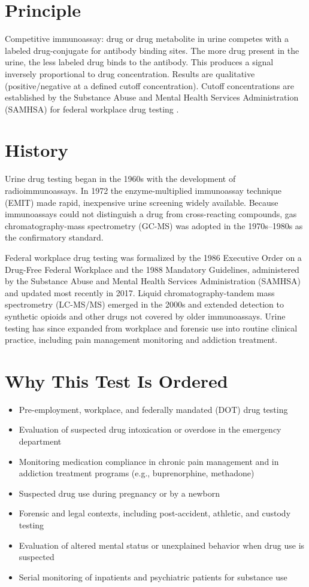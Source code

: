 \section*{Principle}
Competitive immunoassay: drug or drug metabolite in urine competes with a labeled drug-conjugate for antibody binding sites. The more drug present in the urine, the less labeled drug binds to the antibody. This produces a signal inversely proportional to drug concentration. Results are qualitative (positive/negative at a defined cutoff concentration). Cutoff concentrations are established by the Substance Abuse and Mental Health Services Administration (SAMHSA) for federal workplace drug testing \cite{samhsa2017mandatory}.
\section*{History}
Urine drug testing began in the 1960s with the development of radioimmunoassays. In 1972 the enzyme-multiplied immunoassay technique (EMIT) made rapid, inexpensive urine screening widely available. Because immunoassays could not distinguish a drug from cross-reacting compounds, gas chromatography-mass spectrometry (GC-MS) was adopted in the 1970s--1980s as the confirmatory standard.

Federal workplace drug testing was formalized by the 1986 Executive Order on a Drug-Free Federal Workplace and the 1988 Mandatory Guidelines, administered by the Substance Abuse and Mental Health Services Administration (SAMHSA) and updated most recently in 2017. Liquid chromatography-tandem mass spectrometry (LC-MS/MS) emerged in the 2000s and extended detection to synthetic opioids and other drugs not covered by older immunoassays. Urine testing has since expanded from workplace and forensic use into routine clinical practice, including pain management monitoring and addiction treatment.
\section*{Why This Test Is Ordered}
\begin{itemize}
  \item Pre-employment, workplace, and federally mandated (DOT) drug testing
  \item Evaluation of suspected drug intoxication or overdose in the emergency department
  \item Monitoring medication compliance in chronic pain management and in addiction treatment programs (e.g., buprenorphine, methadone)
  \item Suspected drug use during pregnancy or by a newborn
  \item Forensic and legal contexts, including post-accident, athletic, and custody testing
  \item Evaluation of altered mental status or unexplained behavior when drug use is suspected
  \item Serial monitoring of inpatients and psychiatric patients for substance use
\end{itemize}
